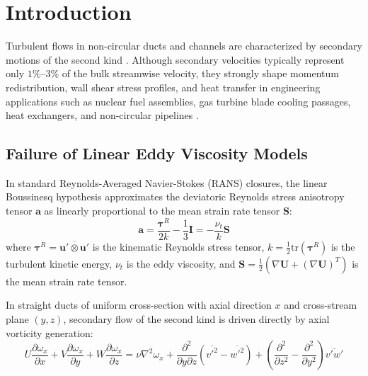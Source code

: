 \documentclass[11pt,a4paper]{article}
\begin{document}
\newpage
\tableofcontents
\newpage

\section{Introduction}

Turbulent flows in non-circular ducts and channels are characterized by secondary motions of the second kind \cite{prandtl1926ausgebildete}. Although secondary velocities typically represent only $1\%\text{--}3\%$ of the bulk streamwise velocity, they strongly shape momentum redistribution, wall shear stress profiles, and heat transfer in engineering applications such as nuclear fuel assemblies, gas turbine blade cooling passages, heat exchangers, and non-circular pipelines \cite{gessner1973origin, brundrett1964production}.

\subsection{Failure of Linear Eddy Viscosity Models}
In standard Reynolds-Averaged Navier-Stokes (RANS) closures, the linear Boussinesq hypothesis approximates the deviatoric Reynolds stress anisotropy tensor $\mathbf{a}$ as linearly proportional to the mean strain rate tensor $\mathbf{S}$:
\begin{equation}
\mathbf{a} = \frac{\boldsymbol{\tau}^R}{2k} - \frac{1}{3}\mathbf{I} = -\frac{\nu_t}{k} \mathbf{S}
\end{equation}
where $\boldsymbol{\tau}^R = \overline{\mathbf{u}' \otimes \mathbf{u}'}$ is the kinematic Reynolds stress tensor, $k = \frac{1}{2}\mathrm{tr}(\boldsymbol{\tau}^R)$ is the turbulent kinetic energy, $\nu_t$ is the eddy viscosity, and $\mathbf{S} = \frac{1}{2}(\nabla \mathbf{U} + (\nabla \mathbf{U})^T)$ is the mean strain rate tensor.

In straight ducts of uniform cross-section with axial direction $x$ and cross-stream plane $(y, z)$, secondary flow of the second kind is driven directly by axial vorticity generation:
\begin{equation}
U \frac{\partial \omega_x}{\partial x} + V \frac{\partial \omega_x}{\partial y} + W \frac{\partial \omega_x}{\partial z} = \nu \nabla^2 \omega_x + \frac{\partial^2}{\partial y \partial z}(\overline{{v'}^2} - \overline{{w'}^2}) + \left(\frac{\partial^2}{\partial z^2} - \frac{\partial^2}{\partial y^2}\right)\overline{v'w'}
\label{eq:vorticity_transport}
\end{equation}
\end{document}
